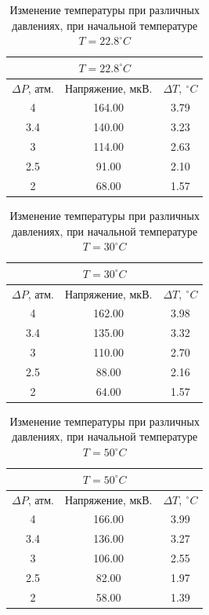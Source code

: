 \documentclass[a4paper, 12pt]{article}
\begin{document}
\begin{table}[h]
    \centering
    \begin{tabular}{|c|c|c|}\hline
    \multicolumn{3}{|c|}{$T = 22.8^\circ C$}\\ \hline
    $\Delta P$, атм.	& Напряжение, мкВ.	& $\Delta T,~^\circ C$	\\ \hline
    4	&   164.00	& 3.79	\\ \hline
    3.4	&   140.00	& 3.23	\\ \hline
    3	&   114.00	& 2.63	\\ \hline
    2.5	&   91.00	& 2.10	\\ \hline
    2	&   68.00	& 1.57	\\ \hline
    \end{tabular}
    \caption{Изменение температуры при различных давлениях, при начальной температуре $T = 22.8^\circ C$}
    \label{tabl:data_22.8}
    \end{table}
    
    
    \begin{table}[h]
    \centering
    \begin{tabular}{|c|c|c|}\hline
    \multicolumn{3}{|c|}{$T = 30^\circ C$}\\ \hline
    $\Delta P$, атм.	& Напряжение, мкВ.	& $\Delta T,~^\circ C$	\\ \hline
    4	& 162.00	& 3.98	\\ \hline
    3.4	& 135.00	& 3.32	\\ \hline
    3	& 110.00	& 2.70	\\ \hline
    2.5	& 88.00	    & 2.16	\\ \hline
    2	& 64.00	    & 1.57	\\ \hline
    \end{tabular}
    \caption{Изменение температуры при различных давлениях, при начальной температуре $T = 30^\circ C$}
    \label{tabl:data_30}
    \end{table}
    
    
    \begin{table}[h]
    \centering
    \begin{tabular}{|c|c|c|}\hline
    \multicolumn{3}{|c|}{$T = 50^\circ C$}\\ \hline
    $\Delta P$, атм.	& Напряжение, мкВ.	& $\Delta T,~^\circ C$	\\ \hline
    4	& 166.00	& 3.99	\\ \hline
    3.4	& 136.00	& 3.27	\\ \hline
    3	& 106.00	& 2.55	\\ \hline
    2.5	& 82.00	    & 1.97	\\ \hline
    2	& 58.00	    & 1.39	\\ \hline
    \end{tabular}
    \caption{Изменение температуры при различных давлениях, при начальной температуре $T = 50^\circ C$}
    \label{tabl:data_50}
    \end{table}
\end{document}
